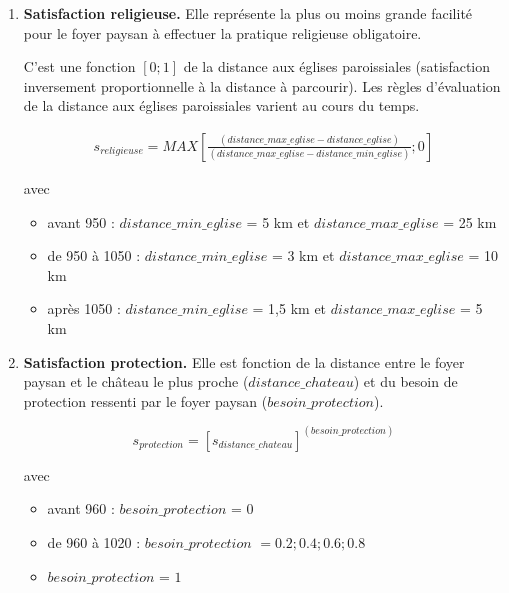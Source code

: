 \documentclass[a4paper,11pt]{article}
\begin{document}
{\begin{sloppypar}
\begin{enumerate}
avec le paramètre \textit{coef\_redevances} égal à 15 pour la Touraine et la variable \textit{redevances\_acquittées} $∈ [0,n]$.

\bigskip

  \item \textbf{Satisfaction religieuse.} Elle représente la plus ou moins grande facilité pour le foyer paysan à effectuer la pratique religieuse obligatoire.
  
C'est une fonction $[0;1]$ de la distance aux églises paroissiales (satisfaction inversement proportionnelle à la distance à parcourir). Les règles d'évaluation de la distance aux églises paroissiales varient au cours du temps.

\begin{small}
\begin{equation}
\begin{gathered}
s_{religieuse} = MAX \left \lbrack \frac{(distance\_max\_eglise - distance\_eglise)}{(distance\_max\_eglise -distance\_min\_eglise)}; 0 \right \rbrack
\end{gathered}
\end{equation}

avec
\begin{itemize}
	\item avant 950 : $distance\_min\_eglise$ = 5 km et $distance\_max\_eglise$ =  25 km
	\item de 950 à 1050 : $distance\_min\_eglise$ = 3 km et $distance\_max\_eglise$ =  10 km
	\item après 1050 : $distance\_min\_eglise$ = 1,5 km et $distance\_max\_eglise$ =  5 km
\end{itemize}

\end{small}

\bigskip
  
  \item \textbf{Satisfaction protection.} Elle est fonction de la distance entre le foyer paysan et le château le plus proche ($distance\_chateau$) et du besoin de protection ressenti par le foyer paysan ($besoin\_protection$).

\begin{equation}
s_{protection} = [s_{distance\_chateau}]^{(besoin\_protection)}
\end{equation}

avec
\begin{itemize}
	\item avant 960 : $besoin\_protection$ = 0
	\item de 960 à 1020 : $besoin\_protection$ $= 0.2 ; 0.4 ; 0.6 ; 0.8$
	\item $besoin\_protection$ = $1$
\end{itemize}


\end{enumerate}
\end{sloppypar}}
\end{document}
